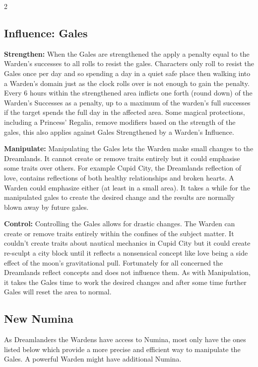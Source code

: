 \begin{multicols}{2}
\subsection*{Influence: Gales}

\noindent \textbf{Strengthen:} When the Gales are strengthened the apply a penalty equal to the Warden's successes to all rolls to resist the gales. Characters only roll to resist the Gales once per day and so spending a day in a quiet safe place then walking into a Warden's domain just as the clock rolls over is not enough to gain the penalty. Every 6 hours within the strengthened area inflicts one forth (round down) of the Warden's Successes as a penalty, up to a maximum of the warden's full successes if the target spends the full day in the affected area. Some magical protections, including a Princess' Regalia, remove modifiers based on the strength of the gales, this also applies against Gales Strengthened by a Warden's Influence. 

\noindent \textbf{Manipulate:} Manipulating the Gales lets the Warden make small changes to the Dreamlands. It cannot create or remove traits entirely but it could emphasise some traits over others. For example Cupid City, the Dreamlands reflection of love, contains reflections of both healthy relationships and broken hearts. A Warden could emphasize either (at least in a small area). It takes a while for the manipulated gales to create the desired change and the results are normally blown away by future gales. 

\noindent \textbf{Control:} Controlling the Gales allows for drastic changes. The Warden can create or remove traits entirely within the confines of the subject matter. It couldn't create traits about nautical mechanics in Cupid City but it could create re-sculpt a city block until it reflects a nonsensical concept like love being a side effect of the moon's gravitational pull. Fortunately for all concerned the Dreamlands reflect concepts and does not influence them. As with Manipulation, it takes the Gales time to work the desired changes and after some time further Gales will reset the area to normal. 

\subsection*{New Numina}
As Dreamlanders the Wardens have access to Numina, most only have the ones listed below which provide a more precise and efficient way to manipulate the Gales. A powerful Warden might have additional Numina. 


\end{multicols}
